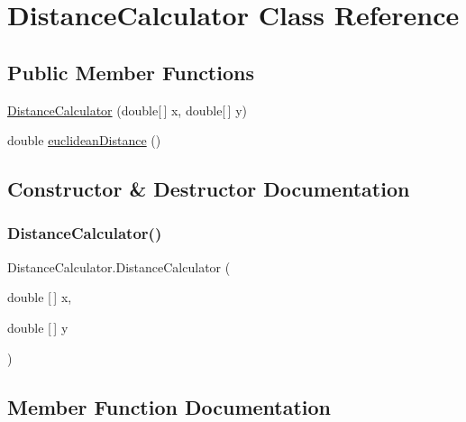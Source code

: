 \hypertarget{class_distance_calculator}{}\section{Distance\+Calculator Class Reference}
\label{class_distance_calculator}
\subsection*{Public Member Functions}
\begin{DoxyCompactItemize}
\item 
\hyperlink{class_distance_calculator_ae6b67de32de1395ecc45d421108b5763}{Distance\+Calculator} (double\mbox{[}$\,$\mbox{]} x, double\mbox{[}$\,$\mbox{]} y)
\item 
double \hyperlink{class_distance_calculator_a1530ee476e59d1da8e59876c16a03f55}{euclidean\+Distance} ()
\end{DoxyCompactItemize}


\subsection{Constructor \& Destructor Documentation}
\mbox{\label{class_distance_calculator_ae6b67de32de1395ecc45d421108b5763}} 
\subsubsection{\texorpdfstring{Distance\+Calculator()}{DistanceCalculator()}}
{\footnotesize\ttfamily Distance\+Calculator.\+Distance\+Calculator (\begin{DoxyParamCaption}\item[{double \mbox{[}$\,$\mbox{]}}]{x,  }\item[{double \mbox{[}$\,$\mbox{]}}]{y }\end{DoxyParamCaption})}



\subsection{Member Function Documentation}
\mbox{\label{class_distance_calculator_a1530ee476e59d1da8e59876c16a03f55}} 
